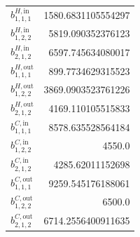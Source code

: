 \documentclass{article}%
\begin{document}
\begin{multicols*}{3}
\begin{supertabular}{lr}
	$b_{1,1,1}^{H,\text{in}}$ & 1580.6831105554297 \\%
	$b_{1,2,2}^{H,\text{in}}$ & 5819.090352376123 \\%
	$b_{2,1,2}^{H,\text{in}}$ & 6597.745634080017 \\%
	$b_{1,1,1}^{H,\text{out}}$ & 899.7734629315523 \\%
	$b_{1,2,2}^{H,\text{out}}$ & 3869.0903523761226 \\%
	$b_{2,1,2}^{H,\text{out}}$ & 4169.110105515833 \\%
	$b_{1,1,1}^{C,\text{in}}$ & 8578.635528564184 \\%
	$b_{1,2,2}^{C,\text{in}}$ & 4550.0 \\%
	$b_{2,1,2}^{C,\text{in}}$ & 4285.62011152698 \\%
	$b_{1,1,1}^{C,\text{out}}$ & 9259.545176188061 \\%
	$b_{1,2,2}^{C,\text{out}}$ & 6500.0 \\%
	$b_{2,1,2}^{C,\text{out}}$ & 6714.2556400911635 \\%
\end{supertabular}%
\end{multicols*}%
\clearpage%
\end{document}
